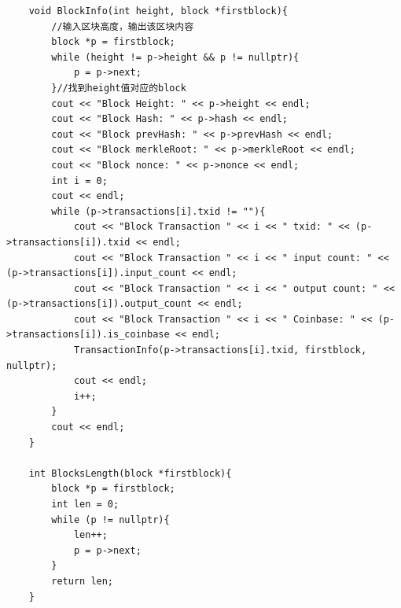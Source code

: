 \documentclass[10pt,a4paper]{article}
\begin{document}
\begin{verbatim}
    void BlockInfo(int height, block *firstblock){
        //输入区块高度，输出该区块内容
        block *p = firstblock;
        while (height != p->height && p != nullptr){
            p = p->next;
        }//找到height值对应的block
        cout << "Block Height: " << p->height << endl;
        cout << "Block Hash: " << p->hash << endl;
        cout << "Block prevHash: " << p->prevHash << endl;
        cout << "Block merkleRoot: " << p->merkleRoot << endl;
        cout << "Block nonce: " << p->nonce << endl;
        int i = 0;
        cout << endl;
        while (p->transactions[i].txid != ""){
            cout << "Block Transaction " << i << " txid: " << (p->transactions[i]).txid << endl;
            cout << "Block Transaction " << i << " input count: " << (p->transactions[i]).input_count << endl;
            cout << "Block Transaction " << i << " output count: " << (p->transactions[i]).output_count << endl;
            cout << "Block Transaction " << i << " Coinbase: " << (p->transactions[i]).is_coinbase << endl;
            TransactionInfo(p->transactions[i].txid, firstblock, nullptr);
            cout << endl;
            i++;
        }
        cout << endl;
    }
    
    int BlocksLength(block *firstblock){
        block *p = firstblock;
        int len = 0;
        while (p != nullptr){
            len++;
            p = p->next;
        }
        return len;
    }
    

\end{verbatim}
\end{document}
